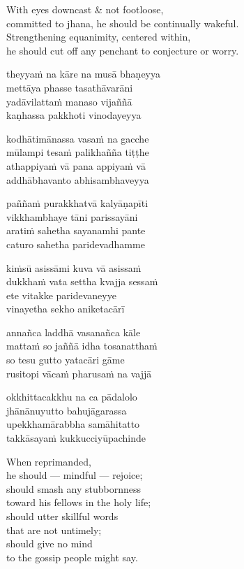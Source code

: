 \documentclass[
  babelLanguage=english,
  final,
  webversion,
]{chantingbook}
\newcommand{\verseref}[1]{\sidepar{#1}}
\begin{document}
With eyes downcast \& not footloose,\\
committed to jhana, he should be continually wakeful.\\
Strengthening equanimity, centered within,\\
he should cut off any penchant to conjecture or worry.

\clearpage

\paliText

\verseref{13}%
theyyaṁ na kāre na musā bhaṇeyya\\
mettāya phasse tasathāvarāni\\
yadāvilattaṁ manaso vijaññā\\
kaṇhassa pakkhoti vinodayeyya

\verseref{14}%
kodhātimānassa vasaṁ na gacche\\
mūlampi tesaṁ palikhañña tiṭṭhe\\
athappiyaṁ vā pana appiyaṁ vā\\
addhābhavanto abhisambhaveyya

\verseref{15}%
paññaṁ purakkhatvā kalyāṇapīti\\
vikkhambhaye tāni parissayāni\\
aratiṁ sahetha sayanamhi pante\\
caturo sahetha paridevadhamme

\verseref{16}%
kiṁsū asissāmi kuva vā asissaṁ\\
dukkhaṁ vata settha kvajja sessaṁ\\
ete vitakke paridevaneyye\\
vinayetha sekho aniketacārī

\verseref{17}%
annañca laddhā vasanañca kāle\\
mattaṁ so jaññā idha tosanatthaṁ\\
so tesu gutto yatacāri gāme\\
rusitopi vācaṁ pharusaṁ na vajjā

\verseref{18}%
okkhittacakkhu na ca pādalolo\\
jhānānuyutto bahujāgarassa\\
upekkhamārabbha samāhitatto\\
takkāsayaṁ kukkucciyūpachinde

\clearpage

\englishText

When reprimanded,\\
he should — mindful — rejoice;\\
should smash any stubbornness\\
toward his fellows in the holy life;\\
should utter skillful words\\
that are not untimely;\\
should give no mind\\
to the gossip people might say.
\end{document}
